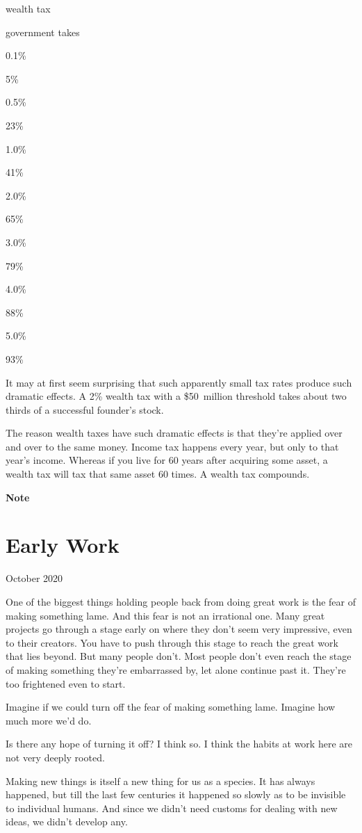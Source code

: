 \documentclass[12pt]{book}
\begin{document}
wealth tax

government takes

0.1\%

5\%

0.5\%

23\%

1.0\%

41\%

2.0\%

65\%

3.0\%

79\%

4.0\%

88\%

5.0\%

93\%

It may at first seem surprising that such apparently small tax rates
produce such dramatic effects. A 2\% wealth tax with a \$50~million
threshold takes about two thirds of a successful founder's stock.

The reason wealth taxes have such dramatic effects is that they're
applied over and over to the same money. Income tax happens every year,
but only to that year's income. Whereas if you live for 60 years after
acquiring some asset, a wealth tax will tax that same asset 60 times. A
wealth tax compounds.

\textbf{Note}
\chapter{Early Work}

October 2020

One of the biggest things holding people back from doing great work is
the fear of making something lame. And this fear is not an irrational
one. Many great projects go through a stage early on where they don't
seem very impressive, even to their creators. You have to push through
this stage to reach the great work that lies beyond. But many people
don't. Most people don't even reach the stage of making something
they're embarrassed by, let alone continue past it. They're too
frightened even to start.

Imagine if we could turn off the fear of making something lame. Imagine
how much more we'd do.

Is there any hope of turning it off? I think so. I think the habits at
work here are not very deeply rooted.

Making new things is itself a new thing for us as a species. It has
always happened, but till the last few centuries it happened so slowly
as to be invisible to individual humans. And since we didn't need
customs for dealing with new ideas, we didn't develop any.
\end{document}
